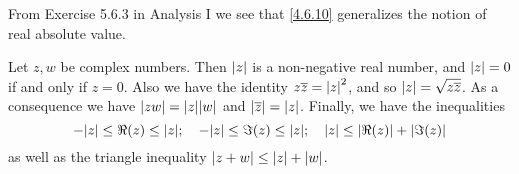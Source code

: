 \begin{note}
  From Exercise 5.6.3 in Analysis I we see that \cref{4.6.10} generalizes the notion of real absolute value.
\end{note}

\begin{lem}\label{4.6.11}
  Let \(z, w\) be complex numbers.
  Then \(\left\lvert z\right\rvert\) is a non-negative real number, and \(\left\lvert z\right\rvert = 0\) if and only if \(z = 0\).
  Also we have the identity \(z \overline{z} = \left\lvert z\right\rvert^2\), and so \(\left\lvert z\right\rvert = \sqrt{z \overline{z}}\).
  As a consequence we have \(\abs{zw} = \abs{z} \abs{w}\) and \(\left\lvert\overline{z}\right\rvert = \left\lvert z\right\rvert\).
  Finally, we have the inequalities
  \[
    -\abs{z} \leq \Re(z) \leq \abs{z}; \quad -\abs{z} \leq \Im(z) \leq \abs{z}; \quad \abs{z} \leq \abs{\Re(z)} + \abs{\Im(z)}
  \]
  as well as the triangle inequality \(\left\lvert z + w\right\rvert \leq \left\lvert z\right\rvert + \left\lvert w\right\rvert\).
\end{lem}

